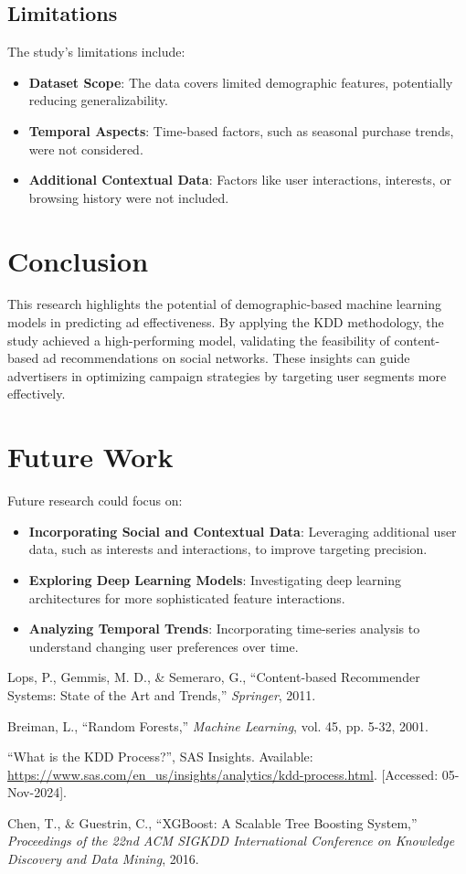 \documentclass[12pt]{article}
\begin{document}
\subsection{Limitations}
The study's limitations include:
\begin{itemize}
    \item \textbf{Dataset Scope}: The data covers limited demographic features, potentially reducing generalizability.
    \item \textbf{Temporal Aspects}: Time-based factors, such as seasonal purchase trends, were not considered.
    \item \textbf{Additional Contextual Data}: Factors like user interactions, interests, or browsing history were not included.
\end{itemize}

\section{Conclusion}
This research highlights the potential of demographic-based machine learning models in predicting ad effectiveness. By applying the KDD methodology, the study achieved a high-performing model, validating the feasibility of content-based ad recommendations on social networks. These insights can guide advertisers in optimizing campaign strategies by targeting user segments more effectively.

\section{Future Work}
Future research could focus on:
\begin{itemize}
    \item \textbf{Incorporating Social and Contextual Data}: Leveraging additional user data, such as interests and interactions, to improve targeting precision.
    \item \textbf{Exploring Deep Learning Models}: Investigating deep learning architectures for more sophisticated feature interactions.
    \item \textbf{Analyzing Temporal Trends}: Incorporating time-series analysis to understand changing user preferences over time.
\end{itemize}

\begin{thebibliography}{9}
Lops, P., Gemmis, M. D., \& Semeraro, G., ``Content-based Recommender Systems: State of the Art and Trends,'' \textit{Springer}, 2011.

Breiman, L., ``Random Forests,'' \textit{Machine Learning}, vol. 45, pp. 5-32, 2001.

``What is the KDD Process?'', SAS Insights. Available: \url{https://www.sas.com/en_us/insights/analytics/kdd-process.html}. [Accessed: 05-Nov-2024].

Chen, T., \& Guestrin, C., ``XGBoost: A Scalable Tree Boosting System,'' \textit{Proceedings of the 22nd ACM SIGKDD International Conference on Knowledge Discovery and Data Mining}, 2016.

\end{thebibliography}
\end{document}
